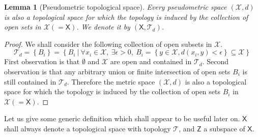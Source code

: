 \documentclass[10pt]{book}
\newcommand{\Tcal}{\mathcal{T}}
\newcommand{\Xcal}{\mathcal{X}}
\newcommand{\Xsf}{\mathsf{X}}
\newcommand{\Zsf}{\mathsf{Z}}
\theoremstyle{break}
\newtheorem{lemma}{Lemma}
\begin{document}
\begin{lemma}[Pseudometric topological space]
Every pseudometric space $(\Xcal,d)$ is also a topological space for which the topology is induced by the collection of open sets in $\Xcal(=\Xsf)$. We denote it by $(\Xsf,\Tcal_d)$.
\end{lemma}


\begin{proof}
We shall consider the following collection of open subsets in $\Xcal$.
%
\begin{equation*}
\Tcal_d = \left\{ B_i \right\} = \left\{B_i \ \bigg| \ \forall x_i \in \Xcal , \ \exists \epsilon > 0, \ B_i = \left\{ y \in \Xcal , d(x_i,y) < \epsilon \right\} \subseteq \Xcal \right\} 
\end{equation*}
%
First observation is that $\emptyset$ and $\Xcal$ are open and contained in $\Tcal_d$. Second observation is that any arbitrary union or finite intersection of open sets $B_i$ is still contained in $\Tcal_d$. Therefore the metric space $(\Xcal,d)$ is also a topological space for which the topology is induced by the collection of open sets $B_i$ in $\Xcal(=\Xsf)$.
\end{proof}


Let us give some generic definition which shall appear to be useful later on. $\Xsf$ shall always denote a topological space with topology $\Tcal$, and $\Zsf$ a subspace of $\Xsf$.%
\end{document}

